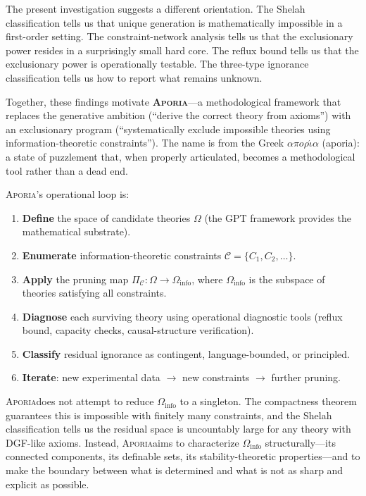 \documentclass[12pt,a4paper]{article}
\theoremstyle{definition}
\theoremstyle{remark}
\newcommand{\Aporia}{\textsc{Aporia}}
\begin{document}
The present investigation suggests a different orientation. The Shelah classification tells us that unique generation is mathematically impossible in a first-order setting. The constraint-network analysis tells us that the exclusionary power resides in a surprisingly small hard core. The reflux bound tells us that the exclusionary power is operationally testable. The three-type ignorance classification tells us how to report what remains unknown.

Together, these findings motivate \textbf{\Aporia}---a methodological framework that replaces the generative ambition (``derive the correct theory from axioms'') with an exclusionary program (``systematically exclude impossible theories using information-theoretic constraints''). The name is from the Greek $\alpha\pi o\rho\acute{\iota}\alpha$ (aporia): a state of puzzlement that, when properly articulated, becomes a methodological tool rather than a dead end.

\Aporia's operational loop is:

\begin{enumerate}[leftmargin=*,itemsep=0pt,topsep=0pt]
\item \textbf{Define} the space of candidate theories $\Omega$ (the GPT framework provides the mathematical substrate).
\item \textbf{Enumerate} information-theoretic constraints $\mathcal{C} = \{C_1, C_2, \ldots\}$.
\item \textbf{Apply} the pruning map $\Pi_{\mathcal{C}}: \Omega \to \Omega_{\mathrm{info}}$, where $\Omega_{\mathrm{info}}$ is the subspace of theories satisfying all constraints.
\item \textbf{Diagnose} each surviving theory using operational diagnostic tools (reflux bound, capacity checks, causal-structure verification).
\item \textbf{Classify} residual ignorance as contingent, language-bounded, or principled.
\item \textbf{Iterate}: new experimental data $\to$ new constraints $\to$ further pruning.
\end{enumerate}

\Aporia does not attempt to reduce $\Omega_{\mathrm{info}}$ to a singleton. The compactness theorem guarantees this is impossible with finitely many constraints, and the Shelah classification tells us the residual space is uncountably large for any theory with DGF-like axioms. Instead, \Aporia aims to characterize $\Omega_{\mathrm{info}}$ structurally---its connected components, its definable sets, its stability-theoretic properties---and to make the boundary between what is determined and what is not as sharp and explicit as possible.
\end{document}
